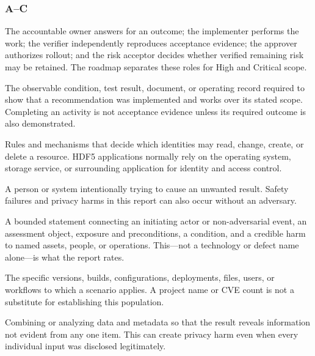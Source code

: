 \documentclass[../main.tex]{subfiles}
\begin{document}
\subsubsection{A--C}
\label{glossary:ac}

\begin{description}[leftmargin=1.5em,style=nextline]

\item[Accountability roles.]
The accountable owner answers for an outcome; the implementer performs the
work; the verifier independently reproduces acceptance evidence; the approver
authorizes rollout; and the risk acceptor decides whether verified remaining
risk may be retained. The roadmap separates these roles for High and Critical
scope.

\item[Acceptance criteria / acceptance evidence.]
The observable condition, test result, document, or operating record required
to show that a recommendation was implemented and works over its stated scope.
Completing an activity is not acceptance evidence unless its required outcome
is also demonstrated.

\item[Access control.]
Rules and mechanisms that decide which identities may read, change, create, or
delete a resource. HDF5 applications normally rely on the operating system,
storage service, or surrounding application for identity and access control.

\item[Adversary / attacker / malicious actor.]
A person or system intentionally trying to cause an unwanted result. Safety
failures and privacy harms in this report can also occur without an adversary.

\item[Adverse-event scenario.]
A bounded statement connecting an initiating actor or non-adversarial event,
an assessment object, exposure and preconditions, a condition, and a credible
harm to named assets, people, or operations. This---not a technology or defect
name alone---is what the report rates.

\item[Affected scope / affected population.]
The specific versions, builds, configurations, deployments, files, users, or
workflows to which a scenario applies. A project name or CVE count is not a
substitute for establishing this population.

\item[Aggregation, correlation, and inference.]
Combining or analyzing data and metadata so that the result reveals information
not evident from any one item. This can create privacy harm even when every
individual input was disclosed legitimately.


\end{description}
\end{document}
